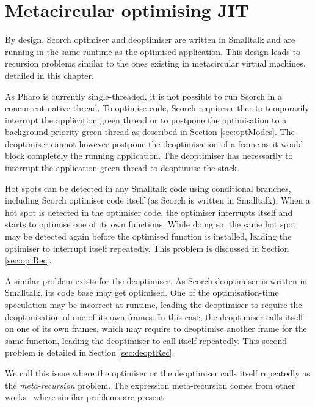 \documentclass[a4paper,12pt,twoside]{../includes/ThesisStyle}
\begin{document}
\fi

\chapter{Metacircular optimising JIT}
\label{chap:metacircular}
\minitoc

By design, Scorch optimiser and deoptimiser are written in Smalltalk and are running in the same runtime as the optimised application. This design leads to recursion problems similar to the ones existing in metacircular virtual machines, detailed in this chapter. 

As Pharo is currently single-threaded, it is not possible to run Scorch in a concurrent native thread. To optimise code, Scorch requires either to temporarily interrupt the application green thread or to postpone the optimisation to a background-priority green thread as described in Section \ref{sec:optModes}. The deoptimiser cannot however postpone the deoptimisation of a frame as it would block completely the running application. The deoptimiser has necessarily to interrupt the application green thread to deoptimise the stack.

Hot spots can be detected in any Smalltalk code using conditional branches, including Scorch optimiser code itself (as Scorch is written in Smalltalk). When a hot spot is detected in the optimiser code, the optimiser interrupts itself and starts to optimise one of its own functions. While doing so, the same hot spot may be detected again before the optimised function is installed, leading the optimiser to interrupt itself repeatedly. This problem is discussed in Section \ref{sec:optRec}.

A similar problem exists for the deoptimiser. As Scorch deoptimiser is written in Smalltalk, its code base may get optimised. One of the optimisation-time speculation may be incorrect at runtime, leading the deoptimiser to require the deoptimisation of one of its own frames. In this case, the deoptimiser calls itself on one of its own frames, which may require to deoptimise another frame for the same function, leading the deoptimiser to call itself repeatedly. This second problem is detailed in Section \ref{sec:deoptRec}.

We call this issue where the optimiser or the deoptimiser calls itself repeatedly as the \emph{meta-recursion} problem. The expression meta-recursion comes from other works~\cite{Chib96a,Denk08b} where similar problems are present.
\end{document}

